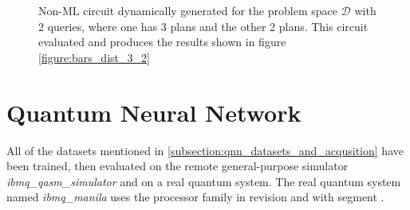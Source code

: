 \begin{figure}
    \centering
    \caption{Non-ML circuit dynamically generated for the problem space $\mathcal{D}$ with 2 queries, where one has 3 plans and the other 2 plans. This circuit evaluated and produces the results shown in figure \ref{figure:bars_dist_3_2}}
    \label{circuit:noml_dyn_problem}
\end{figure}

\newpage

\section{Quantum Neural Network}
\label{chapter:results_qnn}
All of the datasets mentioned in \ref{subsection:qnn_datasets_and_acqusition} have been trained, then evaluated on the remote general-purpose simulator \textit{ibmq\_qasm\_simulator} and on a real quantum system. The real quantum system named \textit{ibmq\_manila} uses the  processor family in revision  and with segment .

